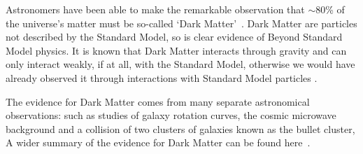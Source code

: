 

Astronomers have been able to make the remarkable observation that
$\sim$80\% of the universe's matter must be so-called `Dark Matter'~\cite{theo-bsm_dm_peskin}.
Dark Matter are particles not described by the Standard Model,
so is clear evidence of Beyond Standard Model physics.
It is known that Dark Matter interacts through gravity
and can only interact weakly, if at all, with the Standard Model,
otherwise we would have already observed it through interactions with Standard Model particles .

The evidence for Dark Matter comes from many separate astronomical observations:
such as studies of
galaxy rotation curves,
the cosmic microwave background
and a collision of two clusters of galaxies known as the bullet cluster,
A wider summary of the evidence for Dark Matter can be found here~\cite{theo-bsm_dm_evidence}.

